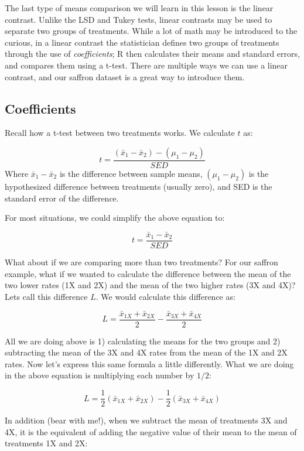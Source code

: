 \documentclass[
]{book}
\begin{document}
The last type of means comparison we will learn in this lesson is the linear contrast. Unlike the LSD and Tukey tests, linear contrasts may be used to separate two groups of treatments. While a lot of math may be introduced to the curious, in a linear contrast the statistician defines two groups of treatments through the use of \emph{coefficients}; R then calculates their means and standard errors, and compares them using a t-test. There are multiple ways we can use a linear contrast, and our saffron dataset is a great way to introduce them.

\hypertarget{coefficients}{%
\subsection{Coefficients}\label{coefficients}}

Recall how a t-test between two treatments works. We calculate \(t\) as:

\[ t = \frac{(\bar{x}_1-\bar{x}_2) - (\mu_1-\mu_2)}{SED}\]
Where \(\bar{x}_1 -\bar{x}_2\) is the difference between sample means, \((\mu_1-\mu_2)\) is the hypothesized difference between treatments (usually zero), and SED is the standard error of the difference.

For most situations, we could simplify the above equation to:

\[ t = \frac{\bar{x}_1-\bar{x}_2}{SED}\]

What about if we are comparing more than two treatments? For our saffron example, what if we wanted to calculate the difference between the mean of the two lower rates (1X and 2X) and the mean of the two higher rates (3X and 4X)? Lets call this difference \(L\). We would calculate this difference as:

\[ L = \frac{\bar{x}_{1X} + \bar{x}_{2X}}{2} - \frac{\bar{x}_{3X} + \bar{x}_{4X}}{2} \]

All we are doing above is 1) calculating the means for the two groups and 2) subtracting the mean of the 3X and 4X rates from the mean of the 1X and 2X rates. Now let's express this same formula a little differently. What we are doing in the above equation is multiplying each number by \(1/2\):

\[ L = \frac{1}{2}(\bar{x}_{1X} + \bar{x}_{2X}) - \frac{1}{2}(\bar{x}_{3X} + \bar{x}_{4X})\]

In addition (bear with me!), when we subtract the mean of treatments 3X and 4X, it is the equivalent of adding the negative value of their mean to the mean of treatments 1X and 2X:
\end{document}
